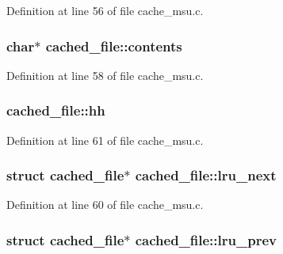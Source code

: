 Definition at line 56 of file cache\-\_\-msu.\-c.

\hypertarget{structcached__file_a67ba78812dfaec45ea673e5639298433}{
\subsubsection[{contents}]{\setlength{\rightskip}{0pt plus 5cm}char$\ast$ cached\-\_\-file\-::contents}}\label{structcached__file_a67ba78812dfaec45ea673e5639298433}


Definition at line 58 of file cache\-\_\-msu.\-c.

\hypertarget{structcached__file_aa1a906a42d707b0c7ce4a479ca6536a9}{
\subsubsection[{hh}]{ cached\-\_\-file\-::hh}}\label{structcached__file_aa1a906a42d707b0c7ce4a479ca6536a9}


Definition at line 61 of file cache\-\_\-msu.\-c.

\hypertarget{structcached__file_abb94a23f7568cd1f1a3cce482a0f6e5a}{
\subsubsection[{lru\-\_\-next}]{\setlength{\rightskip}{0pt plus 5cm}struct {\bf cached\-\_\-file}$\ast$ cached\-\_\-file\-::lru\-\_\-next}}\label{structcached__file_abb94a23f7568cd1f1a3cce482a0f6e5a}


Definition at line 60 of file cache\-\_\-msu.\-c.

\hypertarget{structcached__file_a4810ee4ad0b3824be5889b86d10a0228}{
\subsubsection[{lru\-\_\-prev}]{\setlength{\rightskip}{0pt plus 5cm}struct {\bf cached\-\_\-file}$\ast$ cached\-\_\-file\-::lru\-\_\-prev}}\label{structcached__file_a4810ee4ad0b3824be5889b86d10a0228}


